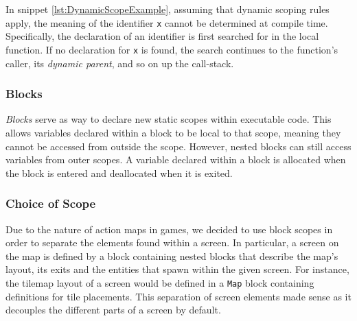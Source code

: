 In snippet \ref{lst:DynamicScopeExample}, assuming that dynamic scoping rules apply, the meaning of the identifier \texttt{x} cannot be determined at compile time.
Specifically, the declaration of an identifier is first searched for in the local function.
If no declaration for \texttt{x} is found, the search continues to the function's caller, its \textit{dynamic parent}, and so on up the call-stack\cite{sebesta_concepts_2016}.

\subsubsection{Blocks}
\textit{Blocks} serve as way to declare new static scopes within executable code.
This allows variables declared within a block to be local to that scope, meaning they cannot be accessed from outside the scope.
However, nested blocks can still access variables from outer scopes.
A variable declared within a block is allocated when the block is entered and deallocated when it is exited\cite{sebesta_concepts_2016}.

\subsubsection{Choice of Scope}
Due to the nature of action maps in games, we decided to use block scopes in order to separate the elements found within a screen.
In particular, a screen on the map is defined by a block containing nested blocks that describe the map's layout, its exits and the entities that spawn within the given screen.
For instance, the tilemap layout of a screen would be defined in a \texttt{Map} block containing definitions for tile placements.
This separation of screen elements made sense as it decouples the different parts of a screen by default.
